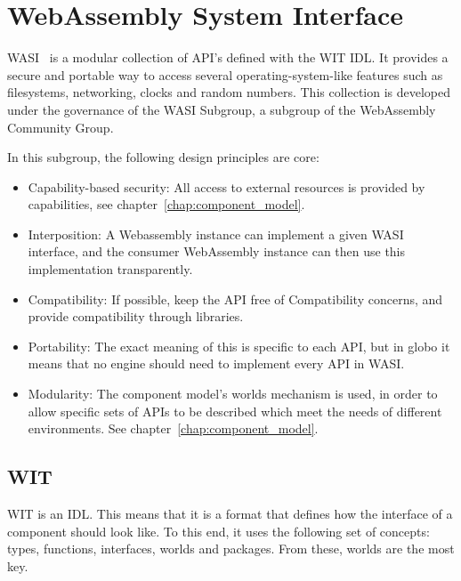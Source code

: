 \section{WebAssembly System Interface}
\label{sec:wasi}

\gls{WASI}~\cite{wasi} is a modular collection of \gls{API}'s defined with the \gls{WIT} IDL. It provides a secure and portable way to access several operating-system-like features such as filesystems, networking, clocks and random numbers. This collection is developed under the governance of the \gls{WASI} Subgroup, a subgroup of the WebAssembly Community Group.

In this subgroup, the following design principles are core:

\begin{itemize}
    \item Capability-based security: All access to external resources is provided by capabilities, see chapter~\ref{chap:component_model}.
    \item Interposition: A Webassembly instance can implement a given WASI interface, and the consumer WebAssembly instance can then use this implementation transparently.
    \item Compatibility: If possible, keep the \gls{API} free of Compatibility concerns, and provide compatibility through libraries.
    \item Portability: The exact meaning of this is specific to each \gls{API}, but in globo it means that no engine should need to implement every \gls{API} in \gls{WASI}.
    \item Modularity: The component model's worlds mechanism is used, in order to allow specific sets of APIs to be described which meet the needs of different environments. See chapter~\ref{chap:component_model}.
\end{itemize}



\subsection{WIT}
\label{sec:wit}

\gls{WIT} is an \gls{IDL}. This means that it is a format that defines how the interface of a component should look like. To this end, it uses the following set of concepts: types, functions, interfaces, worlds and packages. From these, worlds are the most key.


